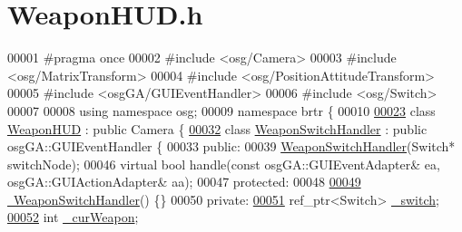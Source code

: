 \hypertarget{_weapon_h_u_d_8h_source}{\section{Weapon\+H\+U\+D.\+h}
\label{_weapon_h_u_d_8h_source}
}

\begin{DoxyCode}
00001 \textcolor{preprocessor}{#pragma once}
00002 \textcolor{preprocessor}{#include <osg/Camera>}
00003 \textcolor{preprocessor}{#include <osg/MatrixTransform>}
00004 \textcolor{preprocessor}{#include <osg/PositionAttitudeTransform>}
00005 \textcolor{preprocessor}{#include <osgGA/GUIEventHandler>}
00006 \textcolor{preprocessor}{#include <osg/Switch>}
00007 
00008 \textcolor{keyword}{using namespace }osg;
00009 \textcolor{keyword}{namespace }brtr \{
00010   
\hypertarget{_weapon_h_u_d_8h_source_l00023}{}\hyperlink{classbrtr_1_1_weapon_h_u_d}{00023} \textcolor{keyword}{class }\hyperlink{classbrtr_1_1_weapon_h_u_d}{WeaponHUD} : \textcolor{keyword}{public} Camera \{
\hypertarget{_weapon_h_u_d_8h_source_l00032}{}\hyperlink{classbrtr_1_1_weapon_h_u_d_1_1_weapon_switch_handler}{00032}     \textcolor{keyword}{class }\hyperlink{classbrtr_1_1_weapon_h_u_d_1_1_weapon_switch_handler}{WeaponSwitchHandler} : \textcolor{keyword}{public} osgGA::GUIEventHandler \{
00033     \textcolor{keyword}{public}:
00039     \hyperlink{classbrtr_1_1_weapon_h_u_d_1_1_weapon_switch_handler}{WeaponSwitchHandler}(Switch* switchNode);
00046         \textcolor{keyword}{virtual} \textcolor{keywordtype}{bool} handle(\textcolor{keyword}{const} osgGA::GUIEventAdapter& ea, osgGA::GUIActionAdapter& aa);
00047     \textcolor{keyword}{protected}:
00048 
\hypertarget{_weapon_h_u_d_8h_source_l00049}{}\hyperlink{classbrtr_1_1_weapon_h_u_d_1_1_weapon_switch_handler_a22b7a9e8884ac0c4a63979d6d441e58f}{00049}         \hyperlink{classbrtr_1_1_weapon_h_u_d_1_1_weapon_switch_handler_a22b7a9e8884ac0c4a63979d6d441e58f}{~WeaponSwitchHandler}() \{\}
00050     \textcolor{keyword}{private}:
\hypertarget{_weapon_h_u_d_8h_source_l00051}{}\hyperlink{classbrtr_1_1_weapon_h_u_d_1_1_weapon_switch_handler_af4b40e431f9cbcaddf843578316bb9c4}{00051}         ref\_ptr<Switch> \hyperlink{classbrtr_1_1_weapon_h_u_d_1_1_weapon_switch_handler_af4b40e431f9cbcaddf843578316bb9c4}{\_switch};
\hypertarget{_weapon_h_u_d_8h_source_l00052}{}\hyperlink{classbrtr_1_1_weapon_h_u_d_1_1_weapon_switch_handler_a15b23d25cb1847f558493adc2a97311e}{00052}         \textcolor{keywordtype}{int} \hyperlink{classbrtr_1_1_weapon_h_u_d_1_1_weapon_switch_handler_a15b23d25cb1847f558493adc2a97311e}{\_curWeapon};

\end{DoxyCode}
